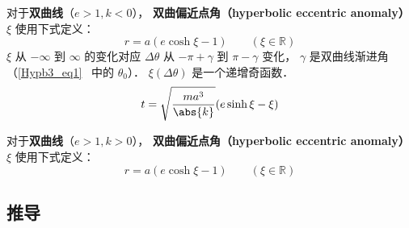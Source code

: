 对于\textbf{双曲线}（$e>1, k<0$）， \textbf{双曲偏近点角（hyperbolic eccentric anomaly）} $\xi$ 使用下式定义：
\begin{equation}\label{EqMoKp_eq2} %
r = a(e\cosh\xi - 1) \qquad (\xi \in \mathbb R)
\end{equation}
$\xi$ 从 $-\infty$ 到 $\infty$ 的变化对应 $\Delta\theta$ 从 $-\pi+\gamma$ 到 $\pi-\gamma$ 变化， $\gamma$ 是双曲线渐进角（\autoref{Hypb3_eq1}~ 中的 $\theta_0$）． $\xi(\Delta\theta)$ 是一个递增奇函数．
\begin{equation}\label{EqMoKp_eq4} %
t = \sqrt{\frac{ma^3}{\abs{k}}} (e\sinh\xi - \xi)
\end{equation}

对于\textbf{双曲线}（$e>1, k>0$）， \textbf{双曲偏近点角（hyperbolic eccentric anomaly）} $\xi$ 使用下式定义：
\begin{equation}
r = a(e\cosh\xi - 1) \qquad (\xi \in \mathbb R)
\end{equation}



\subsection{推导}
